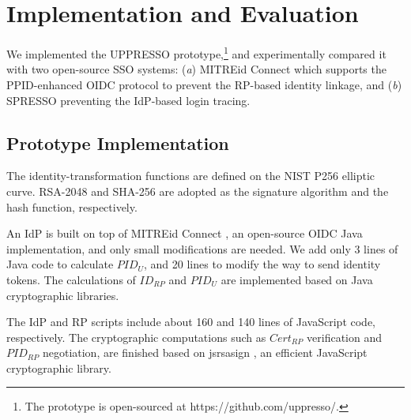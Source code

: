 \section{Implementation and Evaluation}
\label{sec:implementation}
We implemented the UPPRESSO prototype,\footnote{The prototype is open-sourced at https://github.com/uppresso/.}
 and experimentally compared it
 with two open-source SSO systems:
  (\emph{a}) MITREid Connect \cite{MITREid}
    which supports the PPID-enhanced OIDC protocol to prevent the RP-based identity linkage,
     and (\emph{b}) SPRESSO \cite{SPRESSO} preventing the IdP-based login tracing.


\subsection{Prototype Implementation}
\label{subsec:proto-imple}
The identity-transformation functions are defined on
        the NIST P256 elliptic curve.
RSA-2048 and SHA-256 are adopted as the signature algorithm and the hash function, respectively.

An IdP is built on top of MITREid Connect \cite{MITREid},
    an open-source OIDC Java implementation, %
    and only small modifications are needed.
We add only 3 lines of Java code to calculate $PID_U$,
    and 20 lines to modify the way to send identity tokens.
The calculations of $ID_{RP}$ and $PID_U$ are implemented based on Java cryptographic libraries.

The IdP and RP scripts include about 160 and 140 lines of JavaScript code, respectively.
The cryptographic computations such as $Cert_{RP}$ verification and $PID_{RP}$ negotiation, are finished based on jsrsasign \cite{jsrsasign}, an efficient JavaScript cryptographic library.

